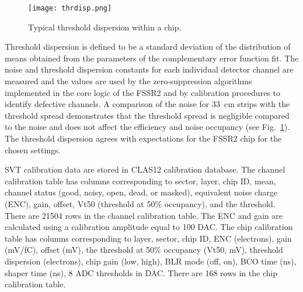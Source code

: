 \begin{figure}[hbt] 
	\centering 
	\texttt{[image: thrdisp.png]}
	\caption{Typical threshold dispersion within a chip.}
	\label{fig:thrdisp}
\end{figure}

Threshold dispersion is defined to be a standard deviation of the distribution of means obtained from the parameters of the complementary error function fit. The noise and threshold dispersion constants for each individual detector channel are measured and the values are used by the zero-suppression algorithms implemented in the core logic of the FSSR2 and by calibration procedures to identify defective channels. A comparison of the noise for 33~cm strips with the threshold spread demonstrates that the threshold spread is negligible compared to the noise and does not affect the efficiency and noise occupancy (see Fig.~\ref{fig:thrdisp}). The threshold dispersion agrees with expectations for the FSSR2 chip for the chosen settings.

SVT calibration data are stored in CLAS12 calibration database. The channel calibration table has columns corresponding to sector, layer, chip ID, mean, channel status (good, noisy, open, dead, or masked), equivalent noise charge (ENC), gain, offset, Vt50 (threshold at 50$\%$ occupancy), and the threshold. There are 21504 rows in the channel calibration table. The ENC and gain are calculated using a calibration amplitude equal to 100 DAC.
The chip calibration table has columns corresponding to layer, sector, chip ID, ENC (electrons), gain (mV/fC), offset (mV), the threshold at 50$\%$ occupancy (Vt50, mV), threshold dispersion (electrons), chip gain (low, high), BLR mode (off, on), BCO time (ns), shaper time (ns), 8 ADC thresholds in DAC. There are 168 rows in the chip calibration table. 

